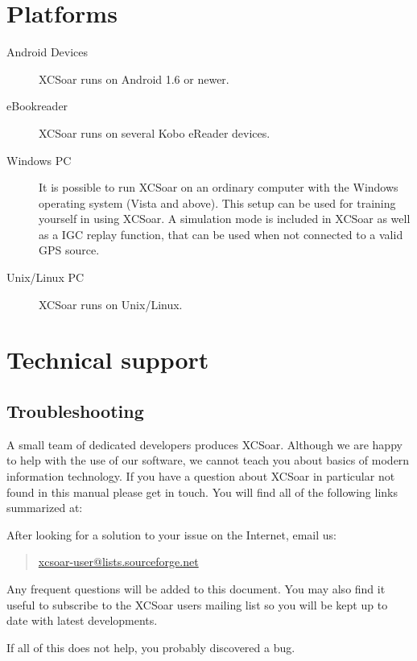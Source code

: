 \section{Platforms}
\begin{description}
\item[Android Devices]
XCSoar runs on Android 1.6 or newer.
\item [eBookreader]
XCSoar runs on several Kobo eReader devices.
\item[Windows PC]
It is possible to run XCSoar on an ordinary computer with the Windows
operating system (Vista and above). This setup can be used for training yourself in using XCSoar.
A simulation mode is included in XCSoar as well as a IGC replay function, that
can be used when not connected to a valid GPS source.
\item[Unix/Linux PC]
XCSoar runs on Unix/Linux.
\end{description}



\section{Technical support}

\subsection*{Troubleshooting}
A small team of dedicated developers produces XCSoar. Although we are
happy to help with the use of our software, we cannot teach you about
basics of modern information technology. If you have a question about XCSoar in
particular not found in this manual please get in touch. You will find all of the following links summarized at:
\begin{quote}
\end{quote}
After looking for a solution to your issue on the Internet,
email us: 
\begin{quote}
\href{mailto:xcsoar-user@lists.sourceforge.net}{xcsoar-user@lists.sourceforge.net}
\end{quote}
Any frequent questions will be added to this document.
You may also find it useful to subscribe to the XCSoar users mailing
list so you will be kept up to date with latest developments.

If all of this does not help, you probably discovered a bug.

